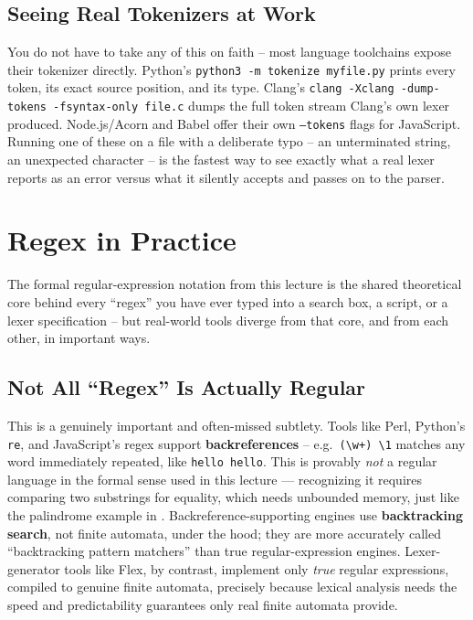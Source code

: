 \documentclass[full-course-notes.tex]{subfiles}
\begin{document}
\subsection{Seeing Real Tokenizers at Work}

You do not have to take any of this on faith -- most language toolchains expose their tokenizer
directly. Python's \texttt{python3 -m tokenize myfile.py} prints every token, its exact source
position, and its type. Clang's \texttt{clang -Xclang -dump-tokens -fsyntax-only file.c} dumps
the full token stream Clang's own lexer produced. Node.js/Acorn and Babel offer their own
\texttt{--tokens} flags for JavaScript. Running one of these on a file with a deliberate typo --
an unterminated string, an unexpected character -- is the fastest way to see exactly what a
real lexer reports as an error versus what it silently accepts and passes on to the parser.

\section{Regex in Practice}
\label{sec:l4-regex-in-practice}

\beyonddb The formal regular-expression notation from this lecture is the shared theoretical
core behind every ``regex'' you have ever typed into a search box, a script, or a lexer
specification -- but real-world tools diverge from that core, and from each other, in
important ways.

\subsection{Not All ``Regex'' Is Actually Regular}

This is a genuinely important and often-missed subtlety. Tools like Perl, Python's \texttt{re},
and JavaScript's regex support \textbf{backreferences} -- e.g.\ \texttt{(\textbackslash w+)
\textbackslash1} matches any word immediately repeated, like \texttt{hello hello}. This is
provably \emph{not} a regular language in the formal sense used in this lecture --- recognizing
it requires comparing two substrings for equality, which needs unbounded memory, just like the
palindrome example in . Backreference-supporting engines use
\textbf{backtracking search}, not finite automata, under the hood; they are more accurately
called ``backtracking pattern matchers'' than true regular-expression engines. Lexer-generator
tools like Flex, by contrast, implement only \emph{true} regular expressions, compiled to
genuine finite automata, precisely because lexical analysis needs the speed and predictability
guarantees only real finite automata provide.
\end{document}
